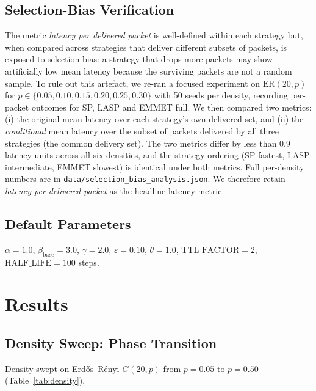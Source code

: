 \documentclass[11pt,a4paper]{article}
\begin{document}
\subsection{Selection-Bias Verification}\label{sec:bias}

The metric \emph{latency per delivered packet} is well-defined within
each strategy but, when compared across strategies that deliver
different subsets of packets, is exposed to selection bias: a strategy
that drops more packets may show artificially low mean latency because
the surviving packets are not a random sample. To rule out this
artefact, we re-ran a focused experiment on $\mathrm{ER}(20, p)$ for
$p \in \{0.05, 0.10, 0.15, 0.20, 0.25, 0.30\}$ with 50 seeds per
density, recording per-packet outcomes for SP, LASP and EMMET full. We
then compared two metrics: (i) the original mean latency over each
strategy's own delivered set, and (ii) the \emph{conditional} mean
latency over the subset of packets delivered by all three strategies
(the common delivery set). The two metrics differ by less than 0.9
latency units across all six densities, and the strategy ordering
(SP fastest, LASP intermediate, EMMET slowest) is identical under both
metrics. Full per-density numbers are in
\texttt{data/selection\_bias\_analysis.json}. We therefore retain
\emph{latency per delivered packet} as the headline latency metric.

\subsection{Default Parameters}

$\alpha = 1.0$, $\beta_{\mathrm{base}} = 3.0$, $\gamma = 2.0$,
$\varepsilon = 0.10$, $\theta = 1.0$, $\mathrm{TTL\_FACTOR} = 2$,
$\mathrm{HALF\_LIFE} = 100$ steps.

\section{Results}

\subsection{Density Sweep: Phase Transition}

Density swept on Erd\H{o}s--R\'enyi $G(20, p)$ from $p{=}0.05$ to
$p{=}0.50$ (Table~\ref{tab:density}).
\end{document}
